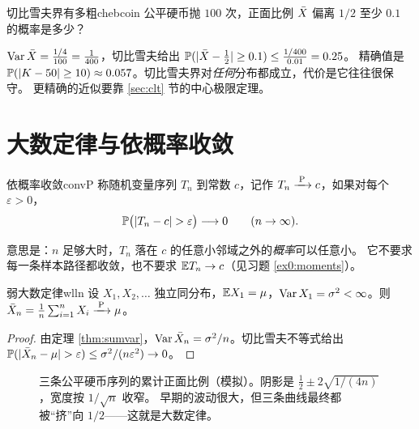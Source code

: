 \begin{example}{切比雪夫界有多粗}{chebcoin}
公平硬币抛 $100$ 次，正面比例 $\Xbar$ 偏离 $1/2$ 至少 $0.1$ 的概率是多少？
\end{example}
\begin{solution}
$\Var\Xbar=\frac{1/4}{100}=\frac1{400}$，切比雪夫给出 $\P(|\Xbar-\tfrac12|\ge0.1)\le\frac{1/400}{0.01}=0.25$。
精确值是 $\P(|K-50|\ge10)\approx0.057$。切比雪夫界对\emph{任何}分布都成立，代价是它往往很保守。
更精确的近似要靠 \ref{sec:clt} 节的中心极限定理。
\end{solution}

\section{大数定律与依概率收敛}

\begin{definition}{依概率收敛}{convP}
称随机变量序列 $T_n$ 到常数 $c$，记作 $T_n\toP c$，如果对每个 $\varepsilon>0$，
\[
\P\big(|T_n-c|>\varepsilon\big)\longrightarrow 0\qquad(n\to\infty).
\]
\end{definition}

意思是：$n$ 足够大时，$T_n$ 落在 $c$ 的任意小邻域之外的\emph{概率}可以任意小。
它不要求每一条样本路径都收敛，也不要求 $\E T_n\to c$（见习题 \ref{ex0:moments}）。

\begin{theorem}{弱大数定律}{wlln}
设 $X_1,X_2,\dots$ 独立同分布，$\E X_1=\mu$，$\Var X_1=\sigma^2<\infty$。则 $\Xbar_n=\frac1n\sum_{i=1}^nX_i\toP\mu$。
\end{theorem}
\begin{proof}
由定理 \ref{thm:sumvar}，$\Var\Xbar_n=\sigma^2/n$。切比雪夫不等式给出
$\P(|\Xbar_n-\mu|>\varepsilon)\le\sigma^2/(n\varepsilon^2)\to0$。
\end{proof}

\begin{figure}[H]
\centering
{}
\caption{三条公平硬币序列的累计正面比例（模拟）。阴影是 $\frac12\pm2\sqrt{1/(4n)}$，宽度按 $1/\sqrt n$ 收窄。
早期的波动很大，但三条曲线最终都被“挤”向 $1/2$——这就是大数定律。}
\label{fig:lln}
\end{figure}

